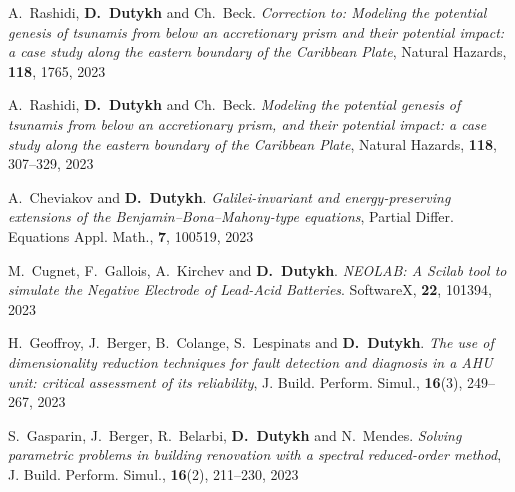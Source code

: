 \begin{etaremune}
  

  \item A.~Rashidi, \textbf{D.~Dutykh} and Ch.~Beck. \textit{Correction to: Modeling the potential genesis of tsunamis from below an accretionary prism and their potential impact: a case study along the eastern boundary of the Caribbean Plate}, Natural Hazards, \textbf{118}, 1765, 2023 %
  
  \item A.~Rashidi, \textbf{D.~Dutykh} and Ch.~Beck. \textit{Modeling the potential genesis of tsunamis from below an accretionary prism, and their potential impact: a case study along the eastern boundary of the Caribbean Plate}, Natural Hazards, \textbf{118}, 307--329, 2023 %

  \item A.~Cheviakov and \textbf{D.~Dutykh}. \textit{Galilei-invariant and energy-preserving extensions of the Benjamin--Bona--Mahony-type equations}, Partial Differ. Equations Appl. Math., \textbf{7}, 100519, 2023 %

  \item M.~Cugnet, F.~Gallois, A.~Kirchev and \textbf{D.~Dutykh}. \textit{NEOLAB: A Scilab tool to simulate the Negative Electrode of Lead-Acid Batteries}. SoftwareX, \textbf{22}, 101394, 2023 %
  
  \item H.~Geoffroy, J.~Berger, B.~Colange, S.~Lespinats and \textbf{D.~Dutykh}. \textit{The use of dimensionality reduction techniques for fault detection and diagnosis in a AHU unit: critical assessment of its reliability}, J. Build. Perform. Simul., \textbf{16}(3), 249--267, 2023 %

  \item S.~Gasparin, J.~Berger, R.~Belarbi, \textbf{D.~Dutykh} and N.~Mendes. \textit{Solving parametric problems in building renovation with a spectral reduced-order method}, J. Build. Perform. Simul., \textbf{16}(2), 211--230, 2023 %


  

\end{etaremune}
